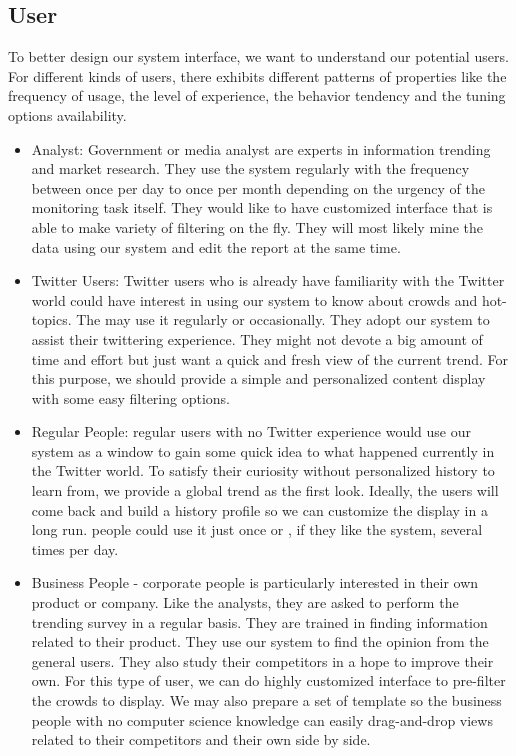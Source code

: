 \documentclass{sig-alternate}
\begin{document}
\subsection{User}
To better design our system interface, we want to understand our potential
users. For different kinds of users, there exhibits different patterns of
properties like the frequency of usage, the level of experience, the behavior
tendency and the tuning options availability.
\begin{itemize}
    \item Analyst: Government or media analyst are experts in information
    trending and market research. They use the system regularly with the
    frequency between once per day to once per month depending on the urgency
    of the monitoring task itself. They would like to have customized interface
    that is able to make variety of filtering on the fly. They will most likely
    mine the data using our system and edit the report at the same time.

    \item Twitter Users: Twitter users who is already have familiarity with the
    Twitter world could have interest in using our system to know about crowds
    and hot-topics. The may use it regularly or occasionally. They adopt our
    system to assist their twittering experience. They might not devote a big
    amount of time and effort but just want a quick and fresh view of the
    current trend. For this purpose, we should provide a simple and
    personalized content display with some easy filtering options.

    \item Regular People: regular users with no Twitter experience would use
    our system as a window to gain some quick idea to what happened currently
    in the Twitter world. To satisfy their curiosity without personalized
    history to learn from, we provide a global trend as the first look.
    Ideally, the users will come back and build a history profile so we can
    customize the display in a long run. people could use it just once or , if
    they like the system, several times per day.

    \item Business People - corporate people is particularly interested in
    their own product or company. Like the analysts, they are asked to perform
    the trending survey in a regular basis. They are trained in finding
    information related to their product. They use our system to find the
    opinion from the general users. They also study their competitors in a hope
    to improve their own. For this type of user, we can do highly customized
    interface to pre-filter the crowds to display. We may also prepare a set of
    template so the business people with no computer science knowledge can
    easily drag-and-drop views related to their competitors and their own side
    by side.

\end{itemize}
\end{document}

